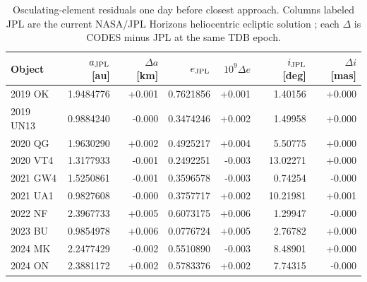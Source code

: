 \begin{table}[H]
\centering
\small
\caption{Osculating-element residuals one day before closest approach. Columns labeled JPL are the current NASA/JPL Horizons heliocentric ecliptic solution \cite{Horizons}; each $\Delta$ is CODES minus JPL at the same TDB epoch.}
\label{tab:neo-element-validation}
\begin{tabularx}{\textwidth}{@{}l r r r r r r@{}}
\toprule
\color{cGold}\textbf{Object} & \color{cGold}\textbf{$a_{\rm JPL}$ [au]} & \color{cGold}\textbf{$\Delta a$ [km]} & \color{cGold}\textbf{$e_{\rm JPL}$} & \color{cGold}\textbf{$10^9\Delta e$} & \color{cGold}\textbf{$i_{\rm JPL}$ [deg]} & \color{cGold}\textbf{$\Delta i$ [mas]}\\
\midrule
2019 OK & 1.9484776 & +0.001 & 0.7621856 & +0.001 & 1.40156 & +0.000\\
2019 UN13 & 0.9884240 & -0.000 & 0.3474246 & +0.002 & 1.49958 & +0.000\\
2020 QG & 1.9630290 & +0.002 & 0.4925217 & +0.004 & 5.50775 & +0.000\\
2020 VT4 & 1.3177933 & -0.001 & 0.2492251 & -0.003 & 13.02271 & +0.000\\
2021 GW4 & 1.5250861 & -0.001 & 0.3596578 & -0.003 & 0.74254 & -0.000\\
2021 UA1 & 0.9827608 & -0.000 & 0.3757717 & +0.002 & 10.21981 & +0.001\\
2022 NF & 2.3967733 & +0.005 & 0.6073175 & +0.006 & 1.29947 & -0.000\\
2023 BU & 0.9854978 & +0.006 & 0.0776724 & +0.005 & 2.76782 & +0.000\\
2024 MK & 2.2477429 & -0.002 & 0.5510890 & -0.003 & 8.48901 & +0.000\\
2024 ON & 2.3881172 & +0.002 & 0.5783376 & +0.002 & 7.74315 & -0.000\\
\bottomrule
\end{tabularx}
\end{table}
